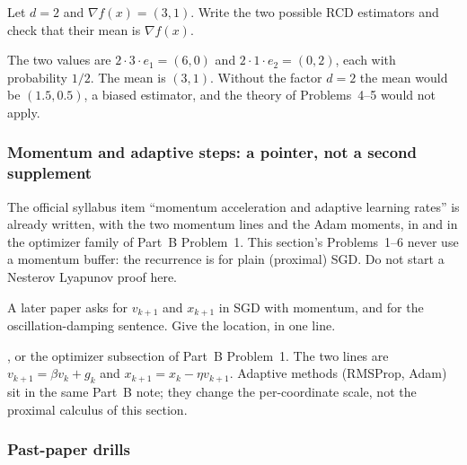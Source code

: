 \begin{exercise}
\label{ex:optu-rcd}
Let $d=2$ and $\nabla f(x)=(3,1)$. Write the two possible RCD estimators and check that their mean is $\nabla f(x)$.
\end{exercise}

\begin{solution}
The two values are $2\cdot 3\cdot e_1=(6,0)$ and $2\cdot 1\cdot e_2=(0,2)$, each with probability $1/2$. The mean is $(3,1)$. Without the factor $d=2$ the mean would be $(1.5,0.5)$, a biased estimator, and the theory of Problems~4--5 would not apply.
\end{solution}


\subsubsection{Momentum and adaptive steps: a pointer, not a second supplement}
\label{subsubsec:optu-mom-ptr}

The official syllabus item ``momentum acceleration and adaptive learning rates'' is already written, with the two momentum lines and the Adam moments, in  and in the optimizer family of Part~B Problem~1. This section's Problems~1--6 never use a momentum buffer: the recurrence is for plain (proximal) SGD. Do not start a Nesterov Lyapunov proof here.

\begin{exercise}
\label{ex:optu-mom-map}
A later paper asks for $v_{k+1}$ and $x_{k+1}$ in SGD with momentum, and for the oscillation-damping sentence. Give the location, in one line.
\end{exercise}

\begin{solution}
, or the optimizer subsection of Part~B Problem~1. The two lines are $v_{k+1}=\beta v_k+g_k$ and $x_{k+1}=x_k-\eta v_{k+1}$. Adaptive methods (RMSProp, Adam) sit in the same Part~B note; they change the per-coordinate scale, not the proximal calculus of this section.
\end{solution}


\subsubsection{Past-paper drills}
\label{subsubsec:optu-drills}

